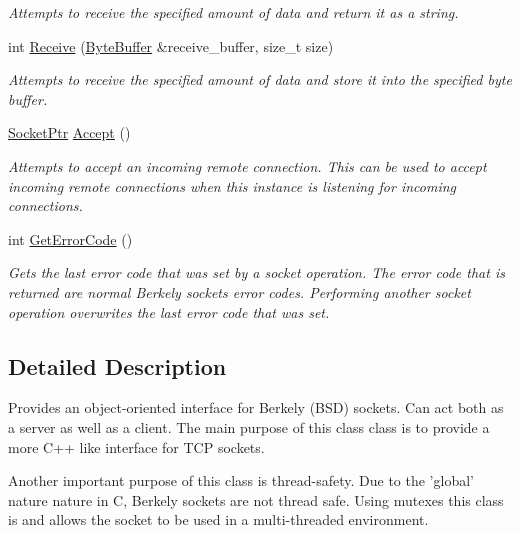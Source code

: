 \begin{DoxyCompactItemize}
\begin{DoxyCompactList}\small\item\em Attempts to receive the specified amount of data and return it as a string. \end{DoxyCompactList}\item 
int \hyperlink{class_senergy_1_1_socket_aad6b0a1a9f7ac380b11b9ef814ada58b}{Receive} (\hyperlink{class_senergy_1_1_byte_buffer}{Byte\-Buffer} \&receive\-\_\-buffer, size\-\_\-t size)
\begin{DoxyCompactList}\small\item\em Attempts to receive the specified amount of data and store it into the specified byte buffer. \end{DoxyCompactList}\item 
\hyperlink{class_senergy_1_1_socket_ac9ff20ce80df2d0c2900cd0940ffe860}{Socket\-Ptr} \hyperlink{class_senergy_1_1_socket_abefda24a1a73b49e108a54342be0457e}{Accept} ()
\begin{DoxyCompactList}\small\item\em Attempts to accept an incoming remote connection. This can be used to accept incoming remote connections when this instance is listening for incoming connections. \end{DoxyCompactList}\item 
int \hyperlink{class_senergy_1_1_socket_a403f7a2f6c5a94d4b14f73f0965da061}{Get\-Error\-Code} ()
\begin{DoxyCompactList}\small\item\em Gets the last error code that was set by a socket operation. The error code that is returned are normal Berkely sockets error codes. Performing another socket operation overwrites the last error code that was set. \end{DoxyCompactList}\end{DoxyCompactItemize}


\subsection{Detailed Description}
Provides an object-\/oriented interface for Berkely (B\-S\-D) sockets. Can act both as a server as well as a client. The main purpose of this class class is to provide a more C++ like interface for T\-C\-P sockets. 

Another important purpose of this class is thread-\/safety. Due to the 'global' nature nature in C, Berkely sockets are not thread safe. Using mutexes this class is and allows the socket to be used in a multi-\/threaded environment.

